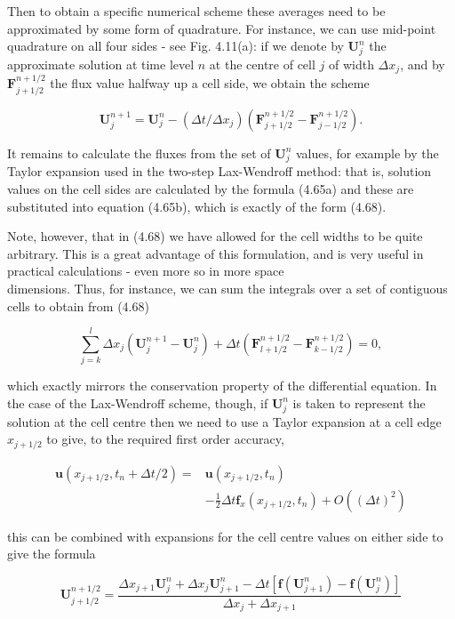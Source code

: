 \documentclass[10pt]{article}
\begin{document}
Then to obtain a specific numerical scheme these averages need to be approximated by some form of quadrature. For instance, we can use mid-point quadrature on all four sides - see Fig. 4.11(a): if we denote by \(\mathbf{U}_{j}^{n}\) the approximate solution at time level \(n\) at the centre of cell \(j\) of width \(\Delta x_{j}\), and by \(\mathbf{F}_{j+1 / 2}^{n+1 / 2}\) the flux value halfway up a cell side, we obtain the scheme

\[
\mathbf{U}_{j}^{n+1}=\mathbf{U}_{j}^{n}-\left(\Delta t / \Delta x_{j}\right)\left(\mathbf{F}_{j+1 / 2}^{n+1 / 2}-\mathbf{F}_{j-1 / 2}^{n+1 / 2}\right) .
\]

It remains to calculate the fluxes from the set of \(\mathbf{U}_{j}^{n}\) values, for example by the Taylor expansion used in the two-step Lax-Wendroff method: that is, solution values on the cell sides are calculated by the formula (4.65a) and these are substituted into equation (4.65b), which is exactly of the form (4.68).

Note, however, that in (4.68) we have allowed for the cell widths to be quite arbitrary. This is a great advantage of this formulation, and is very useful in practical calculations - even more so in more space\\
dimensions. Thus, for instance, we can sum the integrals over a set of contiguous cells to obtain from (4.68)

\[
\sum_{j=k}^{l} \Delta x_{j}\left(\mathbf{U}_{j}^{n+1}-\mathbf{U}_{j}^{n}\right)+\Delta t\left(\mathbf{F}_{l+1 / 2}^{n+1 / 2}-\mathbf{F}_{k-1 / 2}^{n+1 / 2}\right)=0,
\]

which exactly mirrors the conservation property of the differential equation. In the case of the Lax-Wendroff scheme, though, if \(\mathbf{U}_{j}^{n}\) is taken to represent the solution at the cell centre then we need to use a Taylor expansion at a cell edge \(x_{j+1 / 2}\) to give, to the required first order accuracy,

\[
\begin{aligned}
\mathbf{u}\left(x_{j+1 / 2}, t_{n}+\Delta t / 2\right)= & \mathbf{u}\left(x_{j+1 / 2}, t_{n}\right) \\
& -\frac{1}{2} \Delta t \mathbf{f}_{x}\left(x_{j+1 / 2}, t_{n}\right)+O\left((\Delta t)^{2}\right)
\end{aligned}
\]

this can be combined with expansions for the cell centre values on either side to give the formula

\[
\mathbf{U}_{j+1 / 2}^{n+1 / 2}=\frac{\Delta x_{j+1} \mathbf{U}_{j}^{n}+\Delta x_{j} \mathbf{U}_{j+1}^{n}-\Delta t\left[\mathbf{f}\left(\mathbf{U}_{j+1}^{n}\right)-\mathbf{f}\left(\mathbf{U}_{j}^{n}\right)\right]}{\Delta x_{j}+\Delta x_{j+1}}
\]
\end{document}

